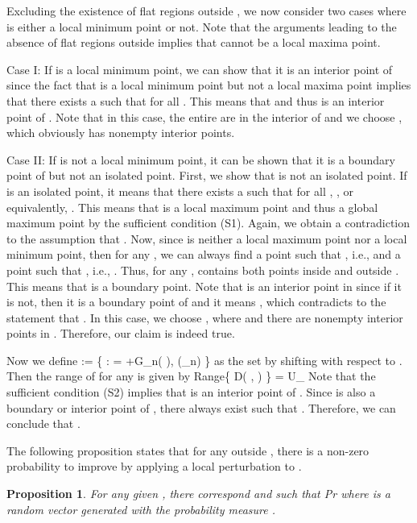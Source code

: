 \documentclass{article}
\newtheorem{prop}{Proposition}
\newcommand{\beq}{}
\newcommand{\hspp}{\hspace{0.05in} }
\newcommand{\pr}{ \textrm{Pr} }
\newcommand{\supp}{ {\mathrm{supp}} }
\newcommand{\thetabm}{ {\boldsymbol{\theta}} }
\newcommand{\deltabm}{ {\boldsymbol{\delta}} }
\newcommand{\omegabm}{ {\boldsymbol{\omega}} }
\begin{document}
Excluding the existence of flat regions outside , we now consider two cases where  is either a local minimum point or not. Note that the arguments leading to the absence of flat regions outside  implies that  cannot be a local maxima point.

Case I:
If  is a local minimum point, we can show that it is an interior point of  since the fact that  is a local minimum point but not a local maxima point implies that there exists a  such that  for all . This means that  and thus  is an interior point of . Note that in this case, the entire  are in the interior of  and we choose , which obviously has nonempty interior points.

Case II:
If  is not a local minimum point, it can be shown that it is a boundary point of  but not an isolated point. First, we show that  is not an isolated point. If  is an isolated point, it means that there exists a  such that for all , , or equivalently, . This means that  is a local maximum point and thus a global maximum point by the sufficient condition (S1). Again, we obtain a contradiction to the assumption that . Now, since  is neither a local maximum point nor a local minimum point, then for any , we can always find a point  such that , i.e.,  and a point  such that , i.e., . Thus, for any ,  contains both points inside and outside . This means that  is a boundary point. Note that  is an interior point in  since if it is not, then it is a boundary point of  and it means , which contradicts to the statement that .
In this case, we choose , where  and there are nonempty interior points in . Therefore, our claim is indeed true.

Now we define 
\beq\nonumber
\Omega := \left\{ \omegabm \in \Theta : \omegabm = \thetabm+G_n(\deltabm), \hspp \deltabm \in \supp(\mu_n) \right\}
\eeq
as the set by shifting  with respect to . Then the range of  for any  is given by
\beq\nonumber
Range\{ D\left ( \thetabm, \cdot \right ) \} = \Omega \cap U_\thetabm
\eeq
Note that the sufficient condition (S2) implies that  is an interior point of . Since  is also a boundary or interior point of , there always exist  such that . Therefore, we can conclude that .


The following proposition states that for any  outside , there is a non-zero probability to improve  by applying a local perturbation to . 

\begin{prop}\label{prop:pos_improve}
For any given , there correspond  and  such that
\beq\nonumber
\pr \left[ f(\thetabm+G_n(\deltabm)) - f(\thetabm) \geq \gamma \right] \geq \eta
\eeq
where  is a random vector generated with the probability measure .
\end{prop}
\end{document}
